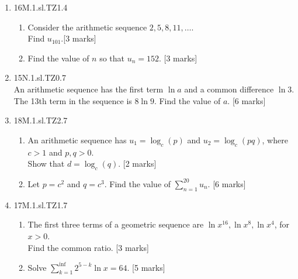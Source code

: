 \documentclass[12pt, twoside]{article}
\begin{document}
\begin{enumerate}
  \item 16M.1.sl.TZ1.4
  \begin{enumerate}
    \item Consider the arithmetic sequence $2, 5, 8, 11, \dots$.\\
    Find $u_{101}$.[3 marks]
    \item Find the value of $n$ so that $u_n = 152$. [3 marks]
  \end{enumerate}

  \item 15N.1.sl.TZ0.7 \\
    An arithmetic sequence has the first term $\ln a$ and a common difference $\ln 3$.\\
    The 13th term in the sequence is $8 \ln 9$. Find the value of $a$. [6 marks]


  \item 18M.1.sl.TZ2.7
  \begin{enumerate}
    \item An arithmetic sequence has $u_1 = \log_c(p)$ and $u_2 = \log_c(pq)$, where $c>1$ and $p, q>0$.\\
    Show that $d = \log_c(q)$. [2 marks]
    \item Let $p=c^2$ and $q=c^3$. Find the value of $\displaystyle \sum_{n=1}^{20} u_n$. [6 marks]
  \end{enumerate}

  \item 17M.1.sl.TZ1.7
  \begin{enumerate}
    \item The first three terms of a geometric sequence are $\ln x^{16}, \ln x^8, \ln x^4$, for $x>0$.\\
    Find the common ratio. [3 marks]
    \item Solve $\displaystyle \sum_{k=1}^{\inf} 2^{5-k} \ln x = 64$. [5 marks]
  \end{enumerate}



\end{enumerate}
\end{document}
